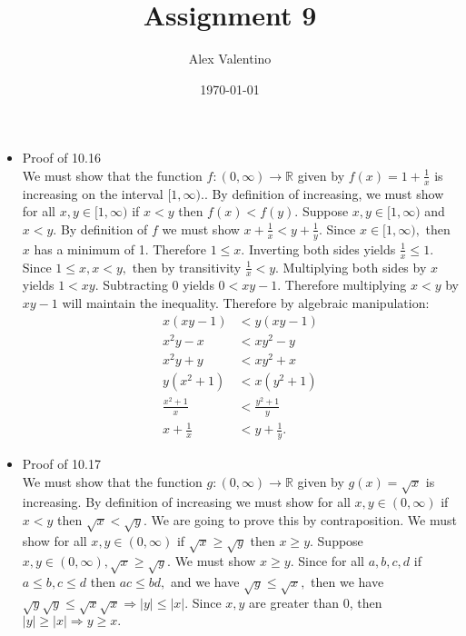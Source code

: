 \documentclass[12pt, letterpaper]{article}
\date{\today}
\author{Alex Valentino}
\title{Assignment 9}
\newcommand{\R}{\mathbb{R}}
\begin{document}
	\begin{itemize}
		\item Proof of 10.16\\
		We must show that the function $f: (0,\infty) \to \R$ given by $f(x) = 1 + \frac{1}{x}$ is increasing on the interval $[1,\infty).$.  By definition of increasing, we must show for all $x,y \in [1,\infty)$ if $x<y$ then $f(x) < f(y).$  Suppose $x,y\in [1,\infty)$ and $x<y$.  By definition of $f$ we must show $x + \frac{1}{x} < y + \frac{1}{y}.$  Since $x\in [1,\infty),$ then $x$ has a minimum of 1.  Therefore $1 \leq x.$  Inverting both sides yields $\frac{1}{x} \leq 1.$  Since $1 \leq x, x < y,$ then by transitivity $\frac{1}{x} < y.$  Multiplying both sides by $x$ yields $1 < xy.$  Subtracting $0$  yields $0< xy-1.$  Therefore multiplying $x<y$ by $xy-1$ will maintain the inequality.  Therefore by algebraic manipulation:
		\begin{align*}
			x(xy-1) &< y(xy-1)\\
			x^2y - x &< xy^2 -y\\
			x^2y + y &< xy^2 + x\\
			y(x^2 + 1) &< x(y^2+1)\\
			\frac{x^2 + 1}{x} &< \frac{y^2 +1}{y}\\
			x + \frac{1}{x} &< y + \frac{1}{y}.	
		\end{align*}
		\item Proof of 10.17\\
		We must show that the function $g: (0,\infty) \to \R$ given by $g(x) = \sqrt{x}$ is increasing.  By definition of increasing we must show for all $x,y \in (0,\infty)$ if $ x<y$ then $\sqrt{x} < \sqrt{y}.$  We are going to prove this by contraposition.  We must show for all  $x,y \in (0,\infty)$ if $\sqrt{x} \geq \sqrt{y}$ then $x \geq y.$ %
		Suppose $x,y \in (0,\infty), \sqrt{x} \geq \sqrt{y}.$  We must show $x \geq y$. Since for all $a,b,c,d$ if $a \leq b, c \leq d$ then $ac \leq bd,$ and we have $\sqrt{y} \leq \sqrt{x},$ then we have $\sqrt{y}\sqrt{y} \leq \sqrt{x} \sqrt{x} \Rightarrow |y| \leq |x|.$ Since $x,y$ are greater than 0, then $|y| \geq |x| \Rightarrow y \geq x.$
	\end{itemize}
\end{document}
